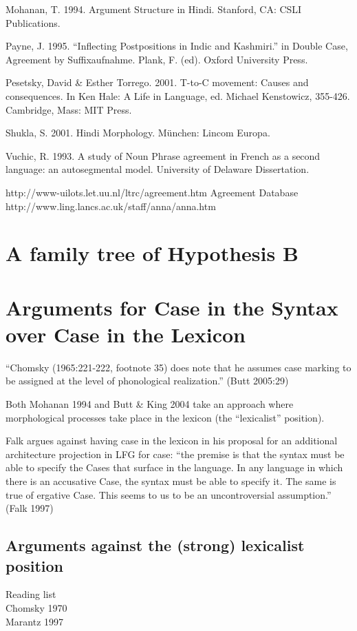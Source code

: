 \documentclass{article}
\begin{document}
\begin{reflist}
Mohanan, T. 1994. Argument Structure in Hindi. Stanford, CA: CSLI Publications.

Payne, J. 1995. ``Inflecting Postpositions in Indic and Kashmiri.” in Double Case, Agreement by Suffixaufnahme. Plank, F. (ed). Oxford University Press.

Pesetsky, David \& Esther Torrego. 2001. T-to-C movement: Causes and consequences. In Ken Hale: A Life in Language, ed. Michael Kenstowicz, 355-426. Cambridge, Mass: MIT Press.

Shukla, S. 2001. Hindi Morphology. München: Lincom Europa.

Vuchic, R. 1993. A study of Noun Phrase agreement in French as a second language: an autosegmental model. University of Delaware Dissertation.

http://www-uilots.let.uu.nl/ltrc/agreement.htm
Agreement Database
http://www.ling.lancs.ac.uk/staff/anna/anna.htm

\end{reflist}



\section{A family tree of Hypothesis B}

\section{Arguments for Case in the Syntax over Case in the Lexicon}

``Chomsky (1965:221-222, footnote 35) does note that he assumes case marking to be assigned at the level of phonological realization.” (Butt 2005:29)

Both Mohanan 1994 and Butt \& King 2004 take an approach where morphological processes take place in the lexicon (the ``lexicalist” position).

Falk argues against having case in the lexicon in his proposal for an additional architecture projection in LFG for case: ``the premise is that the syntax must be able to specify the Cases that surface in the language. In any language in which there is an accusative Case, the syntax must be able to specify it. The same is true of ergative Case. This seems to us to be an uncontroversial assumption.” (Falk 1997)


\subsection{Arguments against the (strong) lexicalist position}
Reading list \\
Chomsky 1970 \\
Marantz 1997\\
\end{document}
